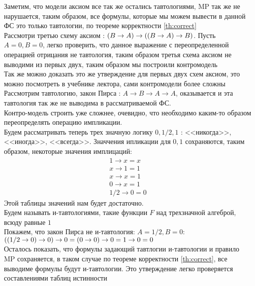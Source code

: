 Заметим, что модели аксиом все так же остались тавтологиями, MP так же не нарушается, таким образом, все формулы, которые мы можем вывести в данной ФС это только тавтологии, по теореме корректности \ref{th:correct} \\
Рассмотри третью схему аксиом : $\left( B \to A \right) \to  \left( \left( B \to A \right) \to B \right)$. Пусть $A  = 0, B = 0$, легко проверить, что данное  выражение с переопределенной операцией отрицания не тавтология, таким образом третья схема аксиом не выводими из первых двух, таким образом мы построили контромодель\\
Так же можно доказать это же утверждение для первых двух схем аксиом, это можно посмотреть в учебнике лектора, сами контромодели более сложны\\
Рассмотрим тавтологию, закон Пирса : $A \to B \to A \to A$, оказывается и эта тавтология так же не выводима в рассматриваемой ФС.\\
Контро-модель строить уже сложнее, очевидно, что необходимо каким-то образом переопределять операцию импликации.\\
Будем рассматривать теперь трех значную логику $0 , 1/2, 1$ : <<никогда>>, <<иногда>>, <<всегда>>. Значчения ипликации для $0, 1$ сохраняются, таким образом, некоторые значения имплицаций:
\begin{equation}
    \begin{aligned}
    1 \to x = x \\
    x \to 1 = 1 \\
    x \to x = 1 \\
    0 \to x = 1 \\
    1/2 \to 0 = 0
    \end{aligned}
\end{equation}
Этой таблицы значений нам будет достаточно.\\
Будем называть и-тавтологиями, такие функции $F$ над трехзначной алгеброй, всюду равные $1$\\
Покажем, что закон Пирса не и-тавтология: $A = 1/2, B = 0$:
$\br{ \br{1/2 \to 0} \to 0 } \to 0 \hm{=} \br{0 \to 0} \to 0 = 1 \to 0 = 0 $\\
Осталось показать, что формулы задающий тавтлогии и-тавтологии и правило MP сохраняется, в таком случае по теореме корректности \ref{th:correct}, все выводиме формулы будут и-тавтологии. Это утверждение легко проверяется составлениями таблиц истинности
